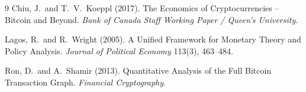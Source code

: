 \documentclass[11pt]{article}
\begin{document}
\begin{thebibliography}{9}
Chiu, J.\ and T.\ V.\ Koeppl (2017). The Economics of Cryptocurrencies -- Bitcoin and Beyond.
\textit{Bank of Canada Staff Working Paper / Queen's University}.

Lagos, R.\ and R.\ Wright (2005). A Unified Framework for Monetary Theory and Policy Analysis.
\textit{Journal of Political Economy} 113(3), 463--484.

Ron, D.\ and A.\ Shamir (2013). Quantitative Analysis of the Full Bitcoin Transaction Graph.
\textit{Financial Cryptography}.
\end{thebibliography}
\end{document}
